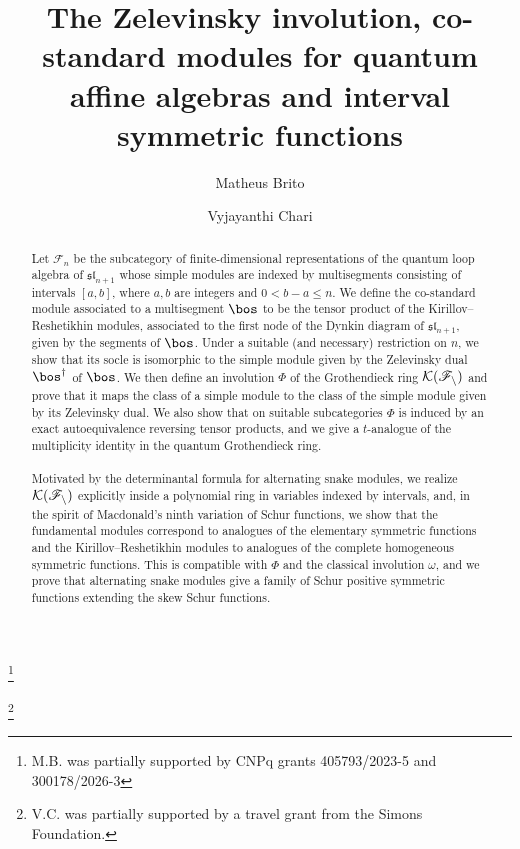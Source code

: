 \documentclass[11pt,reqno]{amsart}
\theoremstyle{definition} \newtheorem*{defn}{Definition}
\theoremstyle{definition}
\numberwithin{equation}{section}
\newcommand{\lie}[1]{\mathfrak{#1}}
\begin{document}
\title[]{The Zelevinsky involution, co-standard modules for quantum affine algebras and interval symmetric functions}
\author{Matheus Brito}
\address{Departamento de Matematica, UFPR, Curitiba - PR - Brazil, 81530-015}
\thanks{M.B. was partially supported by CNPq grants 405793/2023-5 and 300178/2026-3}
\author{Vyjayanthi Chari}
\address{Department of Mathematics, University of California, Riverside, 900 University Ave., Riverside, CA 92521, USA}
\thanks{V.C. was partially supported by a travel grant from the Simons Foundation.}



\begin{abstract}
Let $\mathscr F_n$ be the subcategory of finite-dimensional representations of the quantum loop algebra of $\lie{sl}_{n+1}$ whose
simple modules are indexed by multisegments consisting of intervals $[a,b]$, where $a,b$ are integers and $0<b-a\le n$. We define
the co-standard module associated to a multisegment $\bos$ to be the tensor product of the Kirillov--Reshetikhin modules,
associated to the first node of the Dynkin diagram of $\lie{sl}_{n+1}$, given by the segments of $\bos$. Under a suitable (and
necessary) restriction on $n$, we show that its socle is isomorphic to the simple module given by the Zelevinsky dual $\bos^\dagger$
of $\bos$. We then define an involution $\Phi$ of the Grothendieck ring $\cal K(\mathscr F_n)$ and prove that it maps the class of a simple
module to the class of the simple module given by its Zelevinsky dual. We also show that on suitable subcategories $\Phi$ is
induced by an exact autoequivalence reversing tensor products, and we give a $t$-analogue of the multiplicity identity in the
quantum Grothendieck ring.
\\\\
Motivated by the determinantal formula for alternating snake modules, we realize $\cal K(\mathscr F_n)$ explicitly inside a
polynomial ring in variables indexed by intervals, and, in the spirit of Macdonald's ninth variation of Schur functions, we
show that the fundamental modules correspond to analogues of the elementary symmetric functions and the
Kirillov--Reshetikhin modules to analogues of the complete homogeneous symmetric functions. This is compatible with $\Phi$ and
the classical involution $\omega$, and we prove that alternating snake modules give a family of Schur positive symmetric
functions extending the skew Schur functions.
\end{abstract}
\end{document}
